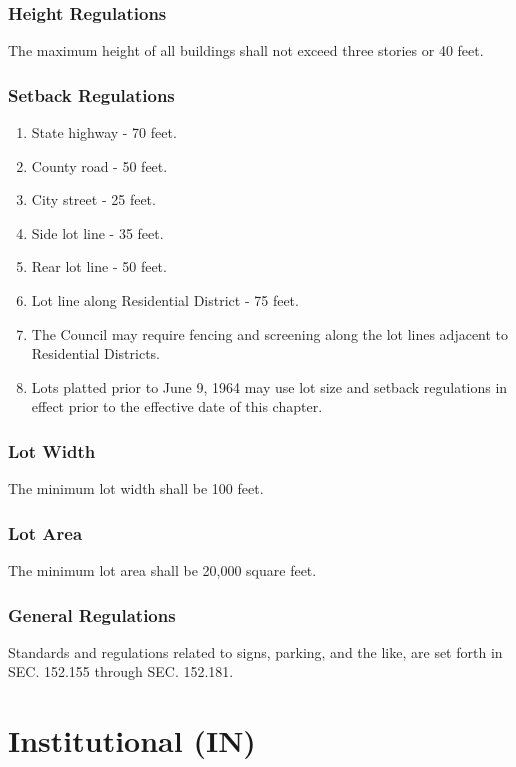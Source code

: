 \subsubsection{Height Regulations}
The maximum height of all buildings shall not exceed three stories or 40 feet.
\subsubsection{Setback Regulations}
\begin{enumerate}[{\indent}a)]
    \item State highway - 70 feet.
    \item County road - 50 feet.
    \item City street - 25 feet.
    \item Side lot line - 35 feet.
    \item Rear lot line - 50 feet.
    \item Lot line along Residential District - 75 feet.
    \item The Council may require fencing and screening along the lot lines adjacent to Residential Districts.
    \item Lots platted prior to June 9, 1964 may use lot size and setback regulations in effect prior to the effective date of this chapter.
\end{enumerate}
\subsubsection{Lot Width}
The minimum lot width shall be 100 feet.
\subsubsection{Lot Area}
The minimum lot area shall be 20,000 square feet.
\subsubsection{General Regulations}
Standards and regulations related to signs, parking, and the like, are set forth in SEC. 152.155 through SEC. 152.181.\\


\setcounter{section}{79}
\section{Institutional (IN)}
